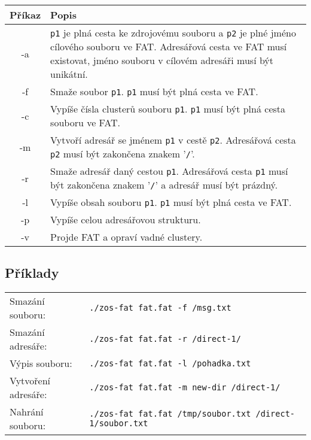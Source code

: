 \documentclass[11pt,a4paper]{scrartcl}
\begin{document}
	\begin{center}
		\begin{tabular}{|c|p{13cm}|}
			\hline
			Příkaz & Popis \\
			\hline
			-a & \verb|p1| je plná cesta ke zdrojovému souboru a \verb|p2| je plné jméno cílového souboru ve FAT. Adresářová cesta ve FAT musí existovat, jméno souboru v cílovém adresáři musí být unikátní.\\
			
			\hline
			
			-f & Smaže soubor \verb|p1|. \verb|p1| musí být plná cesta ve FAT. \\
			
			\hline
			
			-c & Vypíše čísla clusterů souboru \verb|p1|. \verb|p1| musí být plná cesta souboru ve FAT. \\
			
			\hline
			
			-m & Vytvoří adresář se jménem \verb|p1| v cestě \verb|p2|. Adresářová cesta \verb|p2| musí být zakončena znakem '\verb|/|'. \\
			
			\hline
			
			-r & Smaže adresář daný cestou \verb|p1|. Adresářová cesta \verb|p1| musí být zakončena znakem '\verb|/|' a adresář musí být prázdný. \\
			
			\hline
			
			-l & Vypíše obsah souboru \verb|p1|. \verb|p1| musí být plná cesta ve FAT. \\
			
			\hline
			
			-p & Vypíše celou adresářovou strukturu. \\
			
			\hline
			
			-v & Projde FAT a opraví vadné clustery. \\
			
			\hline
		\end{tabular}
	\end{center}
	
	\subsection{Příklady}
	
	\begin{tabular}{l l}
		Smazání souboru: & \verb|./zos-fat fat.fat -f /msg.txt|\\
		Smazání adresáře: & \verb|./zos-fat fat.fat -r /direct-1/| \\
		Výpis souboru: & \verb|./zos-fat fat.fat -l /pohadka.txt| \\
		Vytvoření adresáře: & \verb|./zos-fat fat.fat -m new-dir /direct-1/| \\
		Nahrání souboru: & \verb|./zos-fat fat.fat /tmp/soubor.txt /direct-1/soubor.txt| \\
		
		
	\end{tabular}
	
\end{document}
